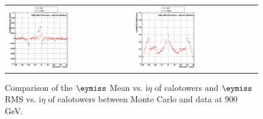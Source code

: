 \begin{figure}[h!]
 \centering
 \begin{tabular}{ll}
  \includegraphics[width=0.5\textwidth]{plots_DataVsMC_MB_900GeV/g_calometPyMean_vs_ieta_900.eps} &
  \includegraphics[width=0.5\textwidth]{plots_DataVsMC_MB_900GeV/g_calometPyRMS_vs_ieta_900.eps} \\
 \end{tabular}
 \caption{\small Comparison of the $\eymiss$ Mean vs. i$\eta$ of calotowers and $\eymiss$ RMS vs. i$\eta$ of calotowers between 
          Monte Carlo and data at $900$ GeV.\label{fig:METy_MeanRMS_vs_ieta_900}}
\end{figure}

\clearpage
